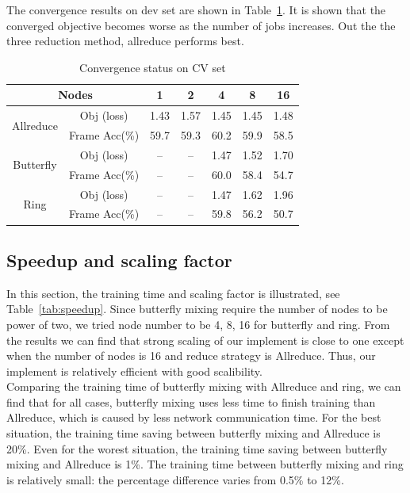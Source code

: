\documentclass{article}
\begin{document}
The convergence results on dev set are shown in Table~\ref{tab:converge}. It is shown that 
the converged objective becomes worse as the number of jobs increases. Out the the three
reduction method, allreduce performs best.
\begin{table}
  \centering
  \begin{tabular}{c|c|c|c|c|c|c}
    \hline
           \multicolumn{2}{c|}{Nodes}         & 1    & 2    & 4    & 8    & 16 \\
    \hline
\multirow{2}{*}{Allreduce} &    Obj (loss)    & 1.43 & 1.57 & 1.45 & 1.45 & 1.48\\
                           &    Frame Acc(\%) & 59.7 & 59.3 & 60.2 & 59.9 & 58.5\\
    \hline
\multirow{2}{*}{Butterfly} &    Obj (loss)    & --   & --   & 1.47 & 1.52 & 1.70\\
                           &    Frame Acc(\%) & --   & --   & 60.0 & 58.4 & 54.7 \\
    \hline
\multirow{2}{*}{Ring}      &    Obj (loss)    & --   & --   & 1.47 & 1.62 & 1.96\\
                           &    Frame Acc(\%) & --   & --   & 59.8 & 56.2 & 50.7 \\
    \hline
  \end{tabular}
  \caption{Convergence status on CV set}
  \label{tab:converge}
\end{table}

\subsection{Speedup and scaling factor}

In this section, the training time and scaling factor is illustrated, see Table~\ref{tab:speedup}. Since butterfly mixing require the number of nodes to be power of two, we tried node number to be 4, 8, 16 for butterfly and ring. From the results we can find that strong scaling of our implement is close to one except when the number of nodes is 16 and reduce strategy is Allreduce. Thus, our implement is relatively efficient with good scalibility. \\

Comparing the training time of butterfly mixing with Allreduce and ring, we can find that for all cases, butterfly mixing uses less time to finish training than Allreduce, which is caused by less network communication time. For the best situation, the training time saving between butterfly mixing and Allreduce is 20\%. Even for the worest situation, the training time saving between butterfly mixing and Allreduce is 1\%. The training time between butterfly mixing and ring is relatively small: the percentage difference varies from 0.5\% to 12\%. 
\end{document}
